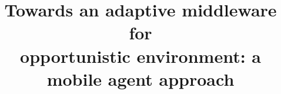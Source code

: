\documentclass{sig-alternate}
\begin{document}
\title{Towards an adaptive middleware for\\ opportunistic environment: a mobile agent approach}

%
%
%
%
\end{document}

